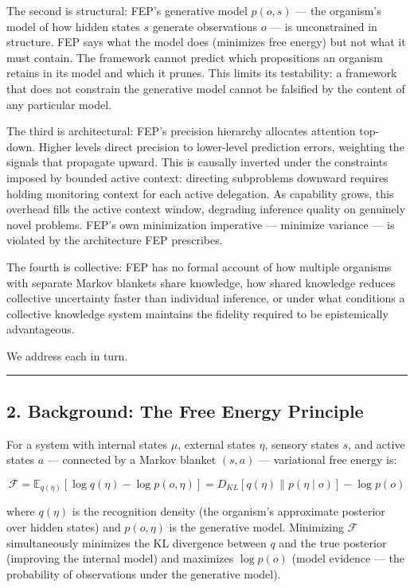 \documentclass[
]{article}
\begin{document}
The second is structural: FEP's generative model \(p(o, s)\) --- the
organism's model of how hidden states \(s\) generate observations \(o\)
--- is unconstrained in structure. FEP says what the model does
(minimizes free energy) but not what it must contain. The framework
cannot predict which propositions an organism retains in its model and
which it prunes. This limits its testability: a framework that does not
constrain the generative model cannot be falsified by the content of any
particular model.

The third is architectural: FEP's precision hierarchy allocates
attention top-down. Higher levels direct precision to lower-level
prediction errors, weighting the signals that propagate upward. This is
causally inverted under the constraints imposed by bounded active
context: directing subproblems downward requires holding monitoring
context for each active delegation. As capability grows, this overhead
fills the active context window, degrading inference quality on
genuinely novel problems. FEP's own minimization imperative --- minimize
variance --- is violated by the architecture FEP prescribes.

The fourth is collective: FEP has no formal account of how multiple
organisms with separate Markov blankets share knowledge, how shared
knowledge reduces collective uncertainty faster than individual
inference, or under what conditions a collective knowledge system
maintains the fidelity required to be epistemically advantageous.

We address each in turn.

\begin{center}\rule{0.5\linewidth}{0.5pt}\end{center}

\subsection{2. Background: The Free Energy
Principle}\label{background-the-free-energy-principle}

For a system with internal states \(\mu\), external states \(\eta\),
sensory states \(s\), and active states \(a\) --- connected by a Markov
blanket \((s, a)\) --- variational free energy is:

\[\mathcal{F} = \mathbb{E}_{q(\eta)}[\log q(\eta) - \log p(o, \eta)]
= D_{KL}[q(\eta) \| p(\eta \mid o)] - \log p(o)\]

where \(q(\eta)\) is the recognition density (the organism's approximate
posterior over hidden states) and \(p(o, \eta)\) is the generative
model. Minimizing \(\mathcal{F}\) simultaneously minimizes the KL
divergence between \(q\) and the true posterior (improving the internal
model) and maximizes \(\log p(o)\) (model evidence --- the probability
of observations under the generative model).
\end{document}
